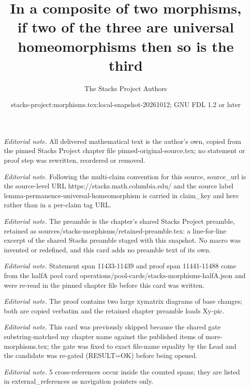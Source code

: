 \documentclass[10pt,a4paper]{amsart}
\title{In a composite of two morphisms, if two of the three are universal homeomorphisms then so is the third}
\author{The Stacks Project Authors}
\date{stacks-project:morphisms.tex:local-snapshot-20261012; GNU FDL 1.2 or later}
\theoremstyle{plain}
\theoremstyle{definition}
\theoremstyle{remark}
\numberwithin{equation}{subsection}
\begin{document}
\maketitle
\noindent\textit{Editorial note.} All delivered mathematical text is the author's own, copied from the pinned Stacks Project chapter file pinned-original-source.tex; no statement or proof step was rewritten, reordered or removed.\par\medskip
\noindent\textit{Editorial note.} Following the multi-claim convention for this source, source\_url is the source-level URL https://stacks.math.columbia.edu/ and the source label lemma-permanence-universal-homeomorphism is carried in claim\_key and here rather than in a per-claim tag URL.\par\medskip
\noindent\textit{Editorial note.} The preamble is the chapter's shared Stacks Project preamble, retained as sources/stacks-morphisms/retained-preamble.tex: a line-for-line excerpt of the shared Stacks preamble staged with this snapshot. No macro was invented or redefined, and this card adds no preamble text of its own.\par\medskip
\noindent\textit{Editorial note.} Statement span 11433-11439 and proof span 11441-11488 come from the halfA pool card operations/pool-cards/stacks-morphisms-halfA.json and were re-read in the pinned chapter file before this card was written.\par\medskip
\noindent\textit{Editorial note.} The proof contains two large xymatrix diagrams of base changes; both are copied verbatim and the retained chapter preamble loads Xy-pic.\par\medskip
\noindent\textit{Editorial note.} This card was previously skipped because the shared gate substring-matched my chapter name against the published items of more-morphisms.tex; the gate was fixed to exact file-name equality by the Lead and the candidate was re-gated (RESULT=OK) before being opened.\par\medskip
\noindent\textit{Editorial note.} 5 cross-references occur inside the counted spans; they are listed in external\_references as navigation pointers only.\par\medskip
\end{document}
